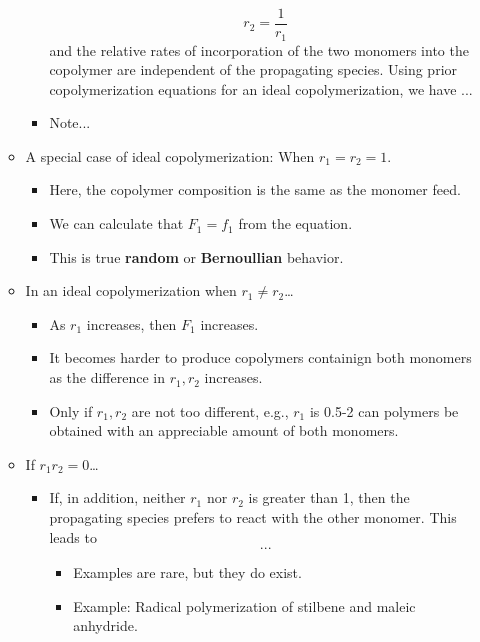 \documentclass[../notes.tex]{subfiles}
\begin{document}
\begin{itemize}
\begin{itemize}
\begin{itemize}
\begin{equation*}
                r_2 = \frac{1}{r_1}
            \end{equation*}
            and the relative rates of incorporation of the two monomers into the copolymer are independent of the propagating species. Using prior copolymerization equations for an ideal copolymerization, we have
            ...
            \item Note...
        \end{itemize}
        \item A special case of ideal copolymerization: When $r_1=r_2=1$.
        \begin{itemize}
            \item Here, the copolymer composition is the same as the monomer feed.
            \item We can calculate that $F_1=f_1$ from the equation.
            \item This is true \textbf{random} or \textbf{Bernoullian} behavior.
        \end{itemize}
        \item In an ideal copolymerization when $r_1\neq r_2$\dots
        \begin{itemize}
            \item As $r_1$ increases, then $F_1$ increases.
            \item It becomes harder to produce copolymers containign both monomers as the difference in $r_1,r_2$ increases.
            \item Only if $r_1,r_2$ are not too different, e.g., $r_1$ is 0.5-2 can polymers be obtained with an appreciable amount of both monomers.
        \end{itemize}
        \item If $r_1r_2=0$\dots
        \begin{itemize}
            \item If, in addition, neither $r_1$ nor $r_2$ is greater than 1, then the propagating species prefers to react with the other monomer. This leads to
            \begin{equation*}
                ...
            \end{equation*}
            \begin{itemize}
                \item Examples are rare, but they do exist.
                \item Example: Radical polymerization of stilbene and maleic anhydride.
            \end{itemize}

\end{itemize}
\end{itemize}
\end{itemize}
\end{document}
